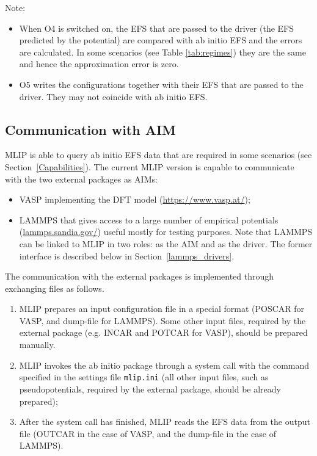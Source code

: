 \documentclass[12pt]{article}
\renewcommand{\_}{\char`_}
\begin{document}
Note:
\begin{itemize}
	\item When O4 is switched on, the EFS that are passed to the driver (the EFS predicted by the potential) are compared with ab initio EFS and the errors are calculated.
	In some scenarios (see Table \ref{tab:regimes}) they are the same and hence the approximation error is zero.  
	
	\item O5 writes the configurations together with their EFS that are passed to the driver. They may not coincide with ab initio EFS. 
\end{itemize}


\subsection{Communication with AIM}\label{abinitio}

MLIP is able to query ab initio EFS data that are required in some scenarios (see Section~\ref{Capabilities}). 
The current MLIP version is capable to communicate with the two external packages as AIMs:
\begin{itemize}
	\item VASP implementing the DFT model (\url{https://www.vasp.at/});
	\item LAMMPS that gives access to a large number of empirical potentials (\url{lammps.sandia.gov/}) useful mostly for testing purposes.
	Note that LAMMPS can be linked to MLIP in two roles: as the AIM and as the driver. The former interface is described below in Section~\ref{lammps_drivers}.
\end{itemize}
The communication with the external packages is implemented through exchanging files as follows. 
\begin{enumerate}
	\item MLIP prepares an input configuration file in a special format  (POSCAR for VASP, and dump-file for LAMMPS). Some other input files, required by the external package (e.g. INCAR and POTCAR for VASP), should be prepared manually.
	\item MLIP invokes the ab initio package through a system call with the command specified in the settings file \texttt{mlip.ini} (all other input files, such as pseudopotentials, required by the external package, should be already prepared);
	\item After the system call has finished, MLIP reads the EFS data from the output file (OUTCAR in the case of VASP, and the dump-file in the case of LAMMPS).
\end{enumerate}
\end{document}
